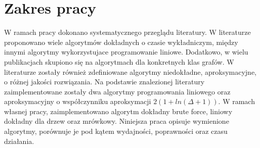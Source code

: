 \section{Zakres pracy}
W ramach pracy dokonano systematycznego przeglądu literatury. W literaturze proponowano wiele algorytmów dokładnych o czasie wykładniczym, między innymi algorytmy wykorzystujace programowanie liniowe. Dodatkowo, w wielu publikacjach skupiono się na algorytmach dla konkretnych klas grafów. W literaturze zostały również zdefiniowane algorytmy niedokładne, aproksymacyjne, o różnej jakości rozwiązania.
Na podstawie znalezionej literatury zaimplementowane zostały dwa algorytmy programowania liniowego oraz aproksymacyjny o współczynniku aproksymacji $2(1 + ln(\Delta + 1))$. W ramach własnej pracy, zaimplementowano algorytm dokładny brute force, liniowy dokładny dla drzew oraz mrówkowy.
Niniejsza praca opisuje wymienione algorytmy, porównuje je pod kątem wydajności, poprawności oraz czasu działania.


